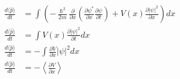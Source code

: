 \documentclass[addpoints]{exam}
\theoremstyle{mytheoremstyle}
\theoremstyle{mytheoremstyle}
\theoremstyle{myproblemstyle}
\begin{document}
\begin{questions}
\begin{solution}
\begin{enumerate}
\begin{equation*}
				      \begin{aligned}
					      \frac{d\langle\hat{p}\rangle}{dt} & = \int \left(-\frac{\hslash^{2}}{2m}\frac{\partial}{\partial x}\left(\frac{\partial \psi^{*}}{\partial x}\frac{\partial \psi}{\partial t}\right)+V(x)\frac{\partial|\psi|^2}{\partial x}\right)dx \\
					      \frac{d\langle\hat{p}\rangle}{dt} & = \int V(x)\frac{\partial|\psi|^2}{\partial t}dx                                                                                                                                                  \\
					      \frac{d\langle\hat{p}\rangle}{dt} & = -\int \frac{\partial V}{\partial x}|\psi|^2dx                                                                                                                                                   \\
					      \frac{d\langle\hat{p}\rangle}{dt} & = -\left\langle\frac{\partial V}{\partial x}\right\rangle
				      \end{aligned}
			      \end{equation*}


		\end{enumerate}
	\end{solution}


\end{questions}
\end{document}
